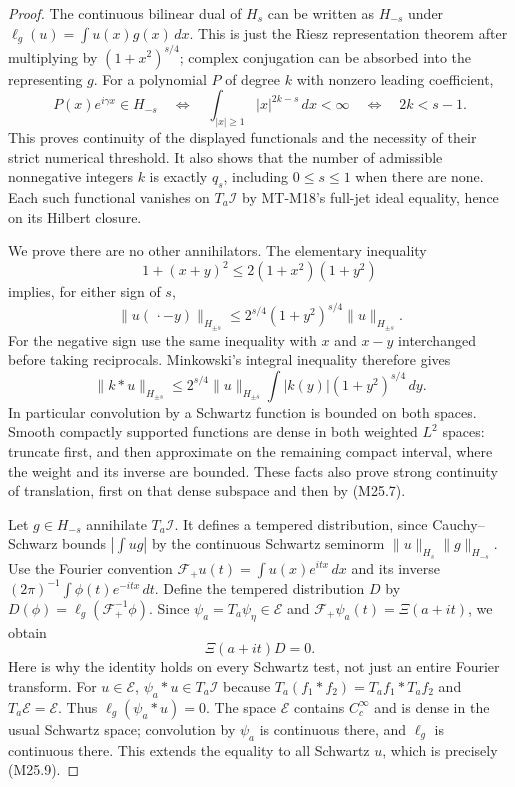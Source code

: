 \documentclass[11pt,a4paper]{article}
\begin{document}
\begin{proof}
The continuous bilinear dual of $H_s$ can be written as
$H_{-s}$ under $\ell_g(u)=\int u(x)g(x)\,dx$.
This is just the Riesz representation theorem after multiplying
by $(1+x^2)^{s/4}$; complex conjugation can be absorbed into
the representing $g$.
For a polynomial $P$ of degree $k$ with nonzero leading
coefficient,
\[
 P(x)e^{i\gamma x}\in H_{-s}
 \quad\Longleftrightarrow\quad
 \int_{|x|\ge1}|x|^{2k-s}\,dx<\infty
 \quad\Longleftrightarrow\quad 2k<s-1.
 \tag{M25.6}
\]
This proves continuity of the displayed functionals and the
necessity of their strict numerical threshold. It also shows
that the number of admissible nonnegative integers $k$ is
exactly $q_s$, including $0\le s\le1$ when there are none.
Each such functional vanishes on $T_a\mathcal I$ by MT-M18's
full-jet ideal equality, hence on its Hilbert closure.

We prove there are no other annihilators. The elementary
inequality
\[
 1+(x+y)^2\le2(1+x^2)(1+y^2)
\]
implies, for either sign of $s$,
\[
 \|u(\,\cdot-y)\|_{H_{\pm s}}
       \le 2^{s/4}(1+y^2)^{s/4}\|u\|_{H_{\pm s}}.
 \tag{M25.7}
\]
For the negative sign use the same inequality with $x$ and
$x-y$ interchanged before taking reciprocals. Minkowski's
integral inequality therefore gives
\[
 \|k*u\|_{H_{\pm s}}
 \le2^{s/4}\|u\|_{H_{\pm s}}
       \int|k(y)|(1+y^2)^{s/4}\,dy.
 \tag{M25.8}
\]
In particular convolution by a Schwartz function is bounded
on both spaces. Smooth compactly supported functions are
dense in both weighted $L^2$ spaces: truncate first, and then
approximate on the remaining compact interval, where the
weight and its inverse are bounded. These facts also prove
strong continuity of translation, first on that dense subspace
and then by (M25.7).

Let $g\in H_{-s}$ annihilate $T_a\mathcal I$.
It defines a tempered distribution, since Cauchy--Schwarz
bounds $|\int ug|$ by the continuous Schwartz seminorm
$\|u\|_{H_s}\|g\|_{H_{-s}}$.
Use the Fourier convention
$\mathcal F_+u(t)=\int u(x)e^{itx}\,dx$ and its inverse
$(2\pi)^{-1}\int\phi(t)e^{-itx}\,dt$.
Define the tempered distribution $D$ by
$D(\phi)=\ell_g(\mathcal F_+^{-1}\phi)$.
Since $\psi_a=T_a\psi_\eta\in\mathcal E$ and
$\mathcal F_+\psi_a(t)=\Xi(a+it)$, we obtain
\[
                         \Xi(a+it)D=0.
 \tag{M25.9}
\]
Here is why the identity holds on every Schwartz test,
not just an entire Fourier transform. For $u\in\mathcal E$,
$\psi_a*u\in T_a\mathcal I$ because
$T_a(f_1*f_2)=T_af_1*T_af_2$ and $T_a\mathcal E=\mathcal E$.
Thus $\ell_g(\psi_a*u)=0$. The space $\mathcal E$ contains
$C_c^\infty$ and is dense in the usual Schwartz space;
convolution by $\psi_a$ is continuous there, and
$\ell_g$ is continuous there. This extends the equality to
all Schwartz $u$, which is precisely (M25.9).


\end{proof}
\end{document}
